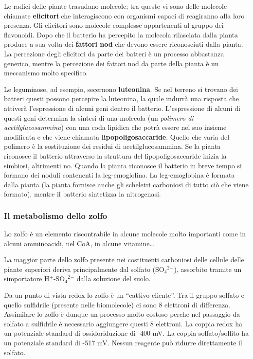 \documentclass[]{article}
\begin{document}
Le radici delle piante trasudano molecole; tra queste vi sono delle
molecole chiamate \textbf{elicitori} che interagiscono con organismi
capaci di reagiranno alla loro presenza. Gli elicitori sono molecole
complesse appartenenti al gruppo dei flavonoidi. Dopo che il batterio ha
percepito la molecola rilasciata dalla pianta produce a sua volta dei
\textbf{fattori nod} che devono essere riconosciuti dalla pianta. La
percezione degli elicitori da parte dei batteri è un processo abbastanza
generico, mentre la percezione dei fattori nod da parte della pianta è
un meccanismo molto specifico.

Le leguminose, ad esempio, secernono \textbf{luteonina}. Se nel terreno
si trovano dei batteri questi possono percepire la luteonina, la quale
indurrà una risposta che attiverà l'espressione di alcuni geni dentro il
batterio. L'espressione di alcuni di questi geni determina la sintesi di
una molecola (un \emph{polimero di acetilglucosammina}) con una coda
lipidica che potrà essere nel suo insieme modificata e che viene
chiamata \textbf{lipopoligosaccaride}. Quello che varia del polimero è
la sostituzione dei residui di acetilglucosammina. Se la pianta
riconosce il batterio attraverso la struttura del lipopoligosaccaride
inizia la simbiosi, altrimenti no. Quando la pianta riconosce il
batterio in breve tempo si formano dei noduli contenenti la
leg-emoglolina. La leg-emoglobina è formata dalla pianta (la pianta
fornisce anche gli scheletri carboniosi di tutto ciò che viene formato),
mentre il batterio sintetizza la nitrogenasi.

\subsubsection{Il metabolismo dello
zolfo}\label{il-metabolismo-dello-zolfo}

Lo zolfo è un elemento riscontrabile in alcune molecole molto importanti
come in alcuni amminoacidi, nel CoA, in alcune vitamine\ldots{}

La maggior parte dello zolfo presente nei costituenti carboniosi delle
cellule delle piante superiori deriva principalmente dal solfato
(SO$_4$$^2$$^-$), assorbito tramite un simportatore H$^+$-SO$_4$$^2$$^-$
dalla soluzione del suolo.

Da un punto di vista redox lo zolfo è un ``cattivo cliente''. Tra il
gruppo solfato e quello sulfidrile (presente nelle biomolecole) ci sono
8 elettroni di differenza. Assimilare lo zolfo è dunque un processo
molto costoso perche nel passaggio da solfato a sulfidrile è necessario
aggiungere questi 8 elettroni. La coppia redox ha un potenziale standard
di ossidoriduzione di -400 mV. La coppia solfato/solfito ha un
potenziale standard di -517 mV. Nessun reagente può ridurre direttamente
il solfato.
\end{document}
